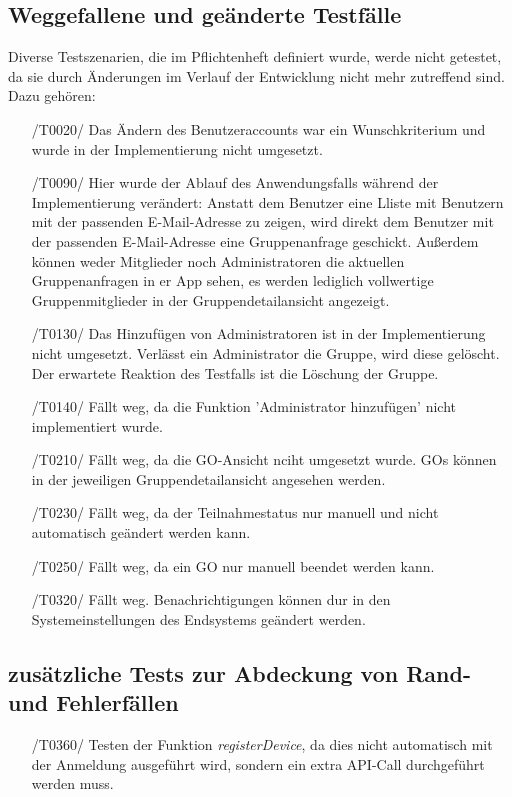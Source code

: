 \documentclass[11pt,a4paper]{scrartcl}
\begin{document}
\subsection{Weggefallene und geänderte Testfälle}\label{weggefallene Testfälle}
Diverse Testszenarien, die im Pflichtenheft definiert wurde, werde nicht getestet, da sie durch Änderungen im Verlauf der Entwicklung nicht mehr zutreffend sind. Dazu gehören:
\begin{itemize}
	\item[/T0020/] Das Ändern des Benutzeraccounts war ein Wunschkriterium und wurde in der Implementierung nicht umgesetzt.
	
	\item[/T0090/] Hier wurde der Ablauf des Anwendungsfalls während der Implementierung verändert: Anstatt dem Benutzer eine Lliste mit Benutzern mit der passenden E-Mail-Adresse zu zeigen, wird direkt dem Benutzer mit der passenden E-Mail-Adresse eine Gruppenanfrage geschickt. Außerdem können weder Mitglieder noch Administratoren die aktuellen Gruppenanfragen in er App sehen, es werden lediglich vollwertige Gruppenmitglieder in der Gruppendetailansicht angezeigt.
	
	\item[/T0130/]\label{130} Das Hinzufügen von Administratoren ist in der Implementierung nicht umgesetzt. Verlässt ein Administrator die Gruppe, wird diese gelöscht. Der erwartete Reaktion des Testfalls ist die Löschung der Gruppe.
	
	\item[/T0140/] Fällt weg, da die Funktion 'Administrator hinzufügen' nicht implementiert wurde.
	
	\item[/T0210/] Fällt weg, da die GO-Ansicht nciht umgesetzt wurde. GOs können in der jeweiligen Gruppendetailansicht angesehen werden.
	
	\item[/T0230/] Fällt weg, da der Teilnahmestatus nur manuell und nicht automatisch geändert werden kann.
	
	\item[/T0250/] Fällt weg, da ein GO nur manuell beendet werden kann.
	
	\item[/T0320/] Fällt weg. Benachrichtigungen können dur in den Systemeinstellungen des Endsystems geändert werden.
	
\end{itemize}

\subsection{zusätzliche Tests zur Abdeckung von Rand- und Fehlerfällen}
\begin{itemize}
	\item[/T0360/]\label{360} Testen der Funktion \textit{registerDevice}, da dies nicht automatisch mit der Anmeldung ausgeführt wird, sondern ein extra API-Call durchgeführt werden muss.
\end{itemize}
\end{document}
